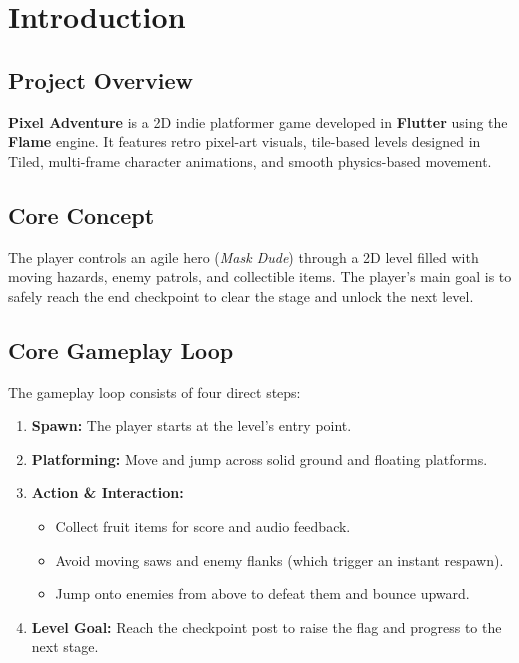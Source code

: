 \documentclass[11pt,a4paper]{article}
\begin{document}
\section{Introduction}

\subsection{Project Overview}
\textbf{Pixel Adventure} is a 2D indie platformer game developed in \textbf{Flutter} using the \textbf{Flame} engine. It features retro pixel-art visuals, tile-based levels designed in Tiled, multi-frame character animations, and smooth physics-based movement.

\subsection{Core Concept}
The player controls an agile hero (\textit{Mask Dude}) through a 2D level filled with moving hazards, enemy patrols, and collectible items. The player's main goal is to safely reach the end checkpoint to clear the stage and unlock the next level.

\subsection{Core Gameplay Loop}
The gameplay loop consists of four direct steps:
\begin{enumerate}[noitemsep]
    \item \textbf{Spawn:} The player starts at the level's entry point.
    \item \textbf{Platforming:} Move and jump across solid ground and floating platforms.
    \item \textbf{Action \& Interaction:}
    \begin{itemize}[noitemsep]
        \item Collect fruit items for score and audio feedback.
        \item Avoid moving saws and enemy flanks (which trigger an instant respawn).
        \item Jump onto enemies from above to defeat them and bounce upward.
    \end{itemize}
    \item \textbf{Level Goal:} Reach the checkpoint post to raise the flag and progress to the next stage.
\end{enumerate}

\end{document}
